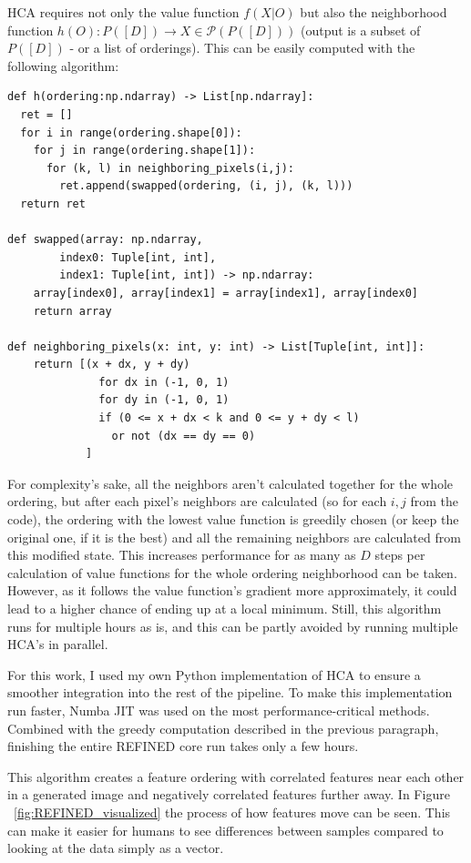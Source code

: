 HCA requires not only the value function $f(X|O)$ but also the neighborhood function $h(O): P([D]) \rightarrow X \in \mathcal{P}(P([D]))$ (output is a subset of $P([D])$ - or a list of orderings). This can be easily computed with the following algorithm:
\begin{lstlisting}
def h(ordering:np.ndarray) -> List[np.ndarray]:
  ret = []
  for i in range(ordering.shape[0]):
    for j in range(ordering.shape[1]):
      for (k, l) in neighboring_pixels(i,j):
        ret.append(swapped(ordering, (i, j), (k, l)))
  return ret

def swapped(array: np.ndarray,
        index0: Tuple[int, int],
        index1: Tuple[int, int]) -> np.ndarray:
    array[index0], array[index1] = array[index1], array[index0]
    return array

def neighboring_pixels(x: int, y: int) -> List[Tuple[int, int]]:
    return [(x + dx, y + dy) 
              for dx in (-1, 0, 1)
              for dy in (-1, 0, 1)
              if (0 <= x + dx < k and 0 <= y + dy < l)
                or not (dx == dy == 0)
            ]
\end{lstlisting}

For complexity's sake, all the neighbors aren't calculated together for the whole ordering, but after each pixel's neighbors are calculated (so for each $i,j$ from the code), the ordering with the lowest value function is greedily chosen (or keep the original one, if it is the best) and all the remaining neighbors are calculated from this modified state. This increases performance for as many as $D$ steps per calculation of value functions for the whole ordering neighborhood can be taken. However, as it follows the value function's gradient more approximately, it could lead to a higher chance of ending up at a local minimum. Still, this algorithm runs for multiple hours as is, and this can be partly avoided by running multiple HCA's in parallel.

For this work, I used my own Python implementation of HCA to ensure a smoother integration into the rest of the pipeline. To make this implementation run faster, Numba JIT was used on the most performance-critical methods. Combined with the greedy computation described in the previous paragraph, finishing the entire REFINED core run takes only a few hours.

This algorithm creates a feature ordering with correlated features near each other in a generated image and negatively correlated features further away. In Figure ~\ref{fig:REFINED_visualized} the process of how features move can be seen. This can make it easier for humans to see differences between samples compared to looking at the data simply as a vector.

